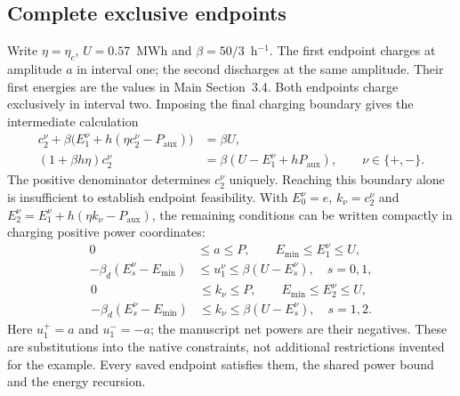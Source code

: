\subsection{Complete exclusive endpoints}
Write $\eta=\eta_c$, $U=0.57$~MWh and $\beta=50/3$~h$^{-1}$.
The first endpoint charges at amplitude $a$ in interval one; the second
discharges at the same amplitude. Their first energies are the values in
Main Section~3.4. Both endpoints charge exclusively in interval two.
Imposing the final charging boundary gives the intermediate calculation
\begin{align}
c_2^\nu+\beta\bigl(E_1^\nu+h(\eta c_2^\nu-P_{\mathrm{aux}})\bigr)
 &=\beta U,\\
(1+\beta h\eta)c_2^\nu
 &=\beta(U-E_1^\nu+hP_{\mathrm{aux}}),\qquad \nu\in\{+,-\}.
\label{eq:endpoint_construction}
\end{align}
The positive denominator determines $c_2^\nu$ uniquely. Reaching this
boundary alone is insufficient to establish endpoint feasibility. With
$E_0^\nu=e$, $k_\nu=c_2^\nu$ and
$E_2^\nu=E_1^\nu+h(\eta k_\nu-P_{\mathrm{aux}})$, the remaining
conditions can be written compactly in charging positive power coordinates:
\begin{equation}\begin{aligned}
0&\leq a\leq P,\qquad E_{\min}\leq E_1^\nu\leq U,\\
-\beta_d(E_s^\nu-E_{\min})&\leq u_1^\nu
\leq\beta(U-E_s^\nu),\quad s=0,1,\label{eq:endpoint_first}\end{aligned}\end{equation}
\begin{equation}\begin{aligned}
0&\leq k_\nu\leq P,\qquad E_{\min}\leq E_2^\nu\leq U,\\
-\beta_d(E_s^\nu-E_{\min})&\leq k_\nu
\leq\beta(U-E_s^\nu),\quad s=1,2.\label{eq:endpoint_second}
\end{aligned}\end{equation}
Here $u_1^+=a$ and $u_1^-=-a$; the manuscript net powers are their
negatives. These are substitutions into the native constraints, not
additional restrictions invented for the example. Every saved endpoint
satisfies them, the shared power bound and the energy recursion.

